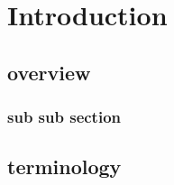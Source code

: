 

\section{Introduction}
\lipsum[1-2]

\subsection{overview}
\lipsum[3-7]

\subsubsection{sub sub section}
\lipsum[8-16]

\subsection{terminology}
\lipsum[5-10]
